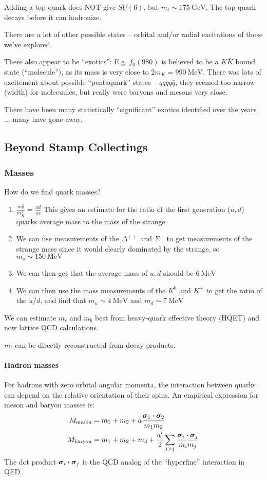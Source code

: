 Adding a top quark does NOT give $SU(6)$, but $m_t\sim\SI{175}{\GeV}$. The top quark decays before it can hadronize.

There are a lot of other possible states -- orbital and/or radial excitations of those we've explored.

There also appear to be ``exotics'': E.g. $f_0(980)$ is believed to be a $K\bar{K}$ bound state (``molecule''), as its mass is very close to $2m_K=\SI{990}{\MeV}$. There was lots of excitement about possible ``pentaquark'' states -- $qqqq\bar{q}$, they seemed too narrow (width) for molecuules, but really were baryons and mesons very close.

There have been many statistically ``significant'' exotics identified over the years ... many have gone away.

\subsection{Beyond Stamp Collectings}

\subsubsection{Masses}
How do we find quark masses?
\begin{enumerate}
\item $\frac{m_\pi^2}{m_K^2}=\frac{ud}{us}$ This gives an estimate for the ratio of the first generation ($u,d$) quarks average mass to the mass of the strange.
\item We can use measurements of the $\Delta^{++}$ and $\Sigma^+$ to get measurements of the strange mass since it would clearly dominated by the strange, so $m_s\sim\SI{150}{\MeV}$
\item We can then get that the average mass of $u,d$ should be $\SI{6}{\MeV}$
\item We can then use the mass measurements of the $K^0$ and $K^+$ to get the ratio of the $u/d$, and find that $m_u\sim\SI{4}{\MeV}$ and $m_d\sim\SI{7}{\MeV}$
\end{enumerate}

We can estimate $m_c$ and $m_b$ best from heavy-quark effective theory (HQET) and now lattice QCD calculations.

$m_t$ can be directly reconstructed from decay products.

\paragraph{Hadron masses} For hadrons with zero orbital angular momenta, the interaction between quarks can depend on the relative orientation of their spins. An empirical expression for meson and baryon masses is:
\begin{align*}
  M_{\text{meson}}&=m_1+m_2+a\frac{\bm{\sigma}_1\vdot\bm{\sigma}_2}{m_1m_2}\\
  M_{\text{baryon}}&=m_1+m_2+m_3+\frac{a'}{2}\sum_{i>j}
  \frac{\bm{\sigma}_i\vdot\bm{\sigma}_j}{m_im_j}
\end{align*}
The dot product $\bm{\sigma}_i\vdot\bm{\sigma}_j$ is the QCD analog of the ``hyperfine'' interaction in QED.


